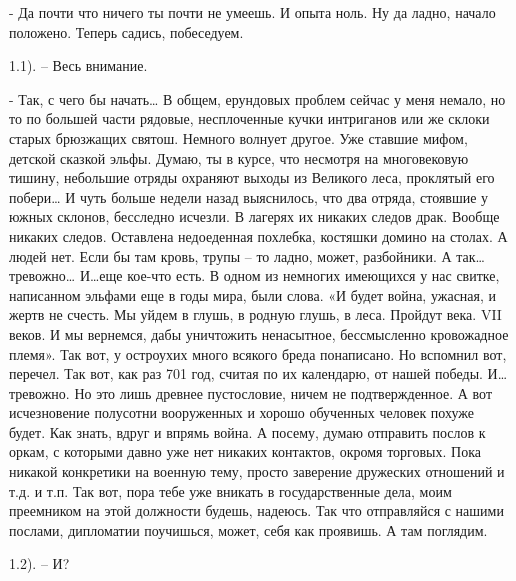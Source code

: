 \documentclass[12pt,a4paper]{book}
\begin{document}
- Да почти что ничего ты почти не умеешь. И опыта ноль. Ну да ладно, начало положено. Теперь садись, побеседуем.

1.1). – Весь внимание.

- Так, с чего бы начать… В общем, ерундовых проблем сейчас у меня немало, но то по большей части рядовые, несплоченные кучки интриганов или же склоки старых брюзжащих святош. Немного волнует другое. Уже ставшие мифом, детской сказкой эльфы. Думаю, ты в курсе, что несмотря на многовековую тишину, небольшие отряды охраняют выходы из Великого леса, проклятый его побери… И чуть больше недели назад выяснилось, что два отряда, стоявшие у южных склонов, бесследно исчезли. В лагерях их никаких следов драк. Вообще никаких следов. Оставлена недоеденная похлебка, костяшки домино на столах. А людей нет. Если бы там кровь, трупы – то ладно, может, разбойники. А так…тревожно… И…еще кое-что есть. В одном из немногих имеющихся у нас свитке, написанном эльфами еще в годы мира, были слова. «И будет война, ужасная, и жертв не счесть. Мы уйдем в глушь, в родную глушь, в леса. Пройдут века. VII веков. И мы вернемся, дабы уничтожить ненасытное, бессмысленно кровожадное племя». Так вот, у остроухих много всякого бреда понаписано. Но вспомнил вот, перечел. Так вот, как раз 701 год, считая по их календарю, от нашей победы. И… тревожно. Но это лишь древнее пустословие, ничем не подтвержденное. А вот исчезновение полусотни вооруженных и хорошо обученных человек похуже будет. Как знать, вдруг и впрямь война. А посему, думаю отправить послов к оркам, с которыми давно уже нет никаких контактов, окромя торговых. Пока никакой конкретики на военную тему, просто заверение дружеских отношений и т.д. и т.п. Так вот, пора тебе уже вникать в государственные дела, моим преемником на этой должности будешь, надеюсь. Так что отправляйся с нашими послами, дипломатии поучишься, может, себя как проявишь. А там поглядим.

1.2). – И?
\end{document}
